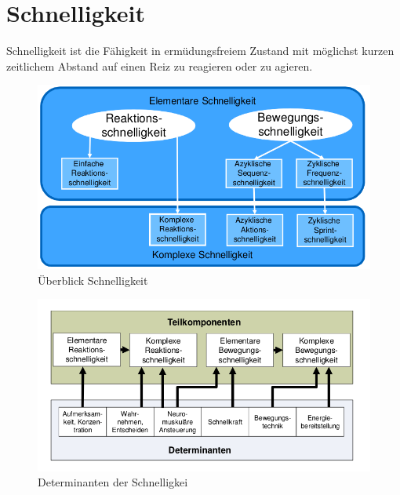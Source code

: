 
\section{Schnelligkeit}
Schnelligkeit ist die Fähigkeit in ermüdungsfreiem Zustand mit möglichst kurzen zeitlichem Abstand auf einen Reiz zu reagieren oder zu agieren.
\begin{figure}[H]
  \centering
  \includegraphics[width=.5\textwidth]{pictures/schnelligkeit_overview.png}
  \caption{Überblick Schnelligkeit}
\end{figure}
\begin{figure}[H]\label{fig:test}
  \centering
  \includegraphics[width=.5\linewidth]{pictures/schnelligkeit_determinanten.png}
  \caption{Determinanten der Schnelligkei}
\end{figure}


